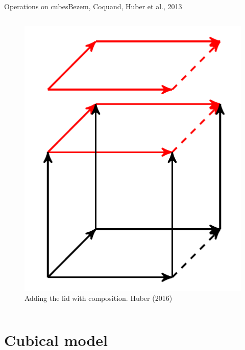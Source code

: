 \documentclass[english,draft]{beamer}
\begin{document}
\begin{frame}{Operations on cubes}{Bezem, Coquand, Huber et al., 2013}
\begin{columns}[c]
        \begin{figure}[h!]
                \includegraphics[height=.4\textheight]{figures/extension.png}
                \caption{Adding the lid with composition. Huber (2016)}
        \end{figure} 

        
\end{columns}
\end{frame}



\section{Cubical model}
\end{document}

